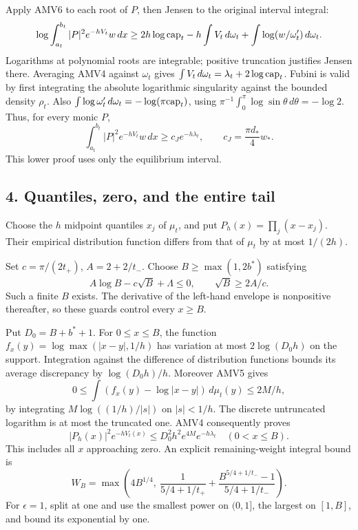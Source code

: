 \documentclass[11pt]{article}
\begin{document}
Apply AMV6 to each root of \(P\), then Jensen to the original interval integral: \[
\log\int_{a_t}^{b_t}|P|^2e^{-hV_t}w\,dx
\ge2h\log{\rm cap}_t-h\int V_t\,d\omega_t
+\int\log(w/\omega_t')\,d\omega_t.
\] Logarithms at polynomial roots are integrable; positive truncation justifies Jensen there. Averaging AMV4 against \(\omega_t\) gives \(\int V_t\,d\omega_t=\lambda_t+2\log{\rm cap}_t\). Fubini is valid by first integrating the absolute logarithmic singularity against the bounded density \(\rho_t\). Also \(\int\log\omega_t'\,d\omega_t=-\log(\pi{\rm cap}_t)\), using \(\pi^{-1}\int_0^\pi\log\sin\theta\,d\theta=-\log2\). Thus, for every monic \(P\), \[
\int_{a_t}^{b_t}|P|^2e^{-hV_t}w\,dx
\ge c_Je^{-h\lambda_t},\qquad
c_J=\frac{\pi d_*}{4}w_*.
\tag{AMV7}
\] This lower proof uses only the equilibrium interval.

\subsection{4. Quantiles, zero, and the entire tail}\label{quantiles-zero-and-the-entire-tail}

Choose the \(h\) midpoint quantiles \(x_j\) of \(\mu_t\), and put \(P_h(x)=\prod_j(x-x_j)\). Their empirical distribution function differs from that of \(\mu_t\) by at most \(1/(2h)\).

Set \(c=\pi/(2t_+)\), \(A=2+2/t_-\). Choose \(B\ge\max(1,2b^*)\) satisfying \[
A\log B-c\sqrt B+\Lambda\le0,\qquad \sqrt B\ge2A/c.
\tag{AMV8}
\] Such a finite \(B\) exists. The derivative of the left-hand envelope is nonpositive thereafter, so these guards control every \(x\ge B\).

Put \(D_0=B+b^*+1\). For \(0\le x\le B\), the function \(f_x(y)=\log\max(|x-y|,1/h)\) has variation at most \(2\log(D_0h)\) on the support. Integration against the difference of distribution functions bounds its average discrepancy by \(\log(D_0h)/h\). Moreover AMV5 gives \[
0\le\int(f_x(y)-\log|x-y|)\,d\mu_t(y)\le2M/h,
\] by integrating \(M\log((1/h)/|s|)\) on \(|s|<1/h\). The discrete untruncated logarithm is at most the truncated one. AMV4 consequently proves \[
|P_h(x)|^2e^{-hV_t(x)}
\le D_0^2h^2e^{4M}e^{-h\lambda_t}\quad(0<x\le B).
\tag{AMV9}
\] This includes all \(x\) approaching zero. An explicit remaining-weight integral bound is \[
W_B=\max\left(4B^{1/4},\
\frac1{5/4+1/t_+}
+\frac{B^{5/4+1/t_-}-1}{5/4+1/t_-}\right).
\] For \(\epsilon=1\), split at one and use the smallest power on \((0,1]\), the largest on \([1,B]\), and bound its exponential by one.
\end{document}
